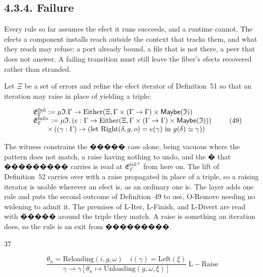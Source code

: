 \documentclass[
  10
]{article}
\begin{document}
\subsection{4.3.4. Failure}\label{failure}

Every rule so far assumes the efect it runs succeeds, and a runtime
cannot. The efects a component installs reach outside the context that
tracks them, and what they reach may refuse: a port already bound, a
file that is not there, a peer that does not answer. A failing
transition must still leave the fiber's efects recovered rather than
stranded.

Let \(\Xi\) be a set of errors and refine the efect iterator of
Definition~51 so that an iteration may raise in place of yielding a
triple:

\[
\begin{array} { r l } & { \mathfrak { E } _ { \Gamma } ^ { \mathrm { f a i l } } : = \mu \mathfrak { I } . \Gamma \to \mathrm { E i t h e r } ( \Xi , \Gamma \times ( \Gamma \to \Gamma ) \times \mathsf { M a y b e } ( \mathfrak { I } ) ) } \\ & { \mathfrak { E } _ { \Gamma } ^ { \mathrm { f a i l } * } : = \mu \mathfrak { I } . \left( e : \Gamma \to \mathrm { E i t h e r } ( \Xi , \Gamma \times ( \Gamma \to \Gamma ) \times \mathsf { M a y b e } ( \mathfrak { I } ) ) \right) } \\ & { \qquad \times \left( ( \gamma : \Gamma ) \to ( \mathrm { l e t ~ R i g h t } ( \delta , g , o ) = e ( \gamma ) \mathrm { ~ i n ~ } g ( \delta ) \simeq \gamma ) \right) } \end{array}\tag{49}
\]

The witness constrains the ����� case alone, being vacuous where the
pattern does not match, a raise having nothing to undo, and the � that
��������� carries is read at
\(\mathfrak { E } _ { \Gamma } ^ { \mathrm { f a i l } * }\) from here
on. The lift of Definition~52 carries over with a raise propagated in
place of a triple, so a raising iterator is usable wherever an efect is,
as an ordinary one is. The layer adds one rule and puts the second
outcome of Definition~49 to use, O-Remove needing no widening to admit
it. The premises of L-Iter, L-Finish, and L-Divert are read with �����
around the triple they match. A raise is something an iteration does, so
the rule is an exit from ���������.

37

\[
\frac { \theta _ { n } = { \mathrm { R e l o a d i n g } } ( i , g , \omega ) \quad i ( \gamma ) = { \mathrm { L e f t } } ( \xi ) } { \gamma \longrightarrow \gamma [ \theta _ { n } \mapsto { \mathrm { U n l o a d i n g } } ( g , \omega , \xi ) ] } ~ { \mathrm { L - R a i s e } }
\]
\end{document}

